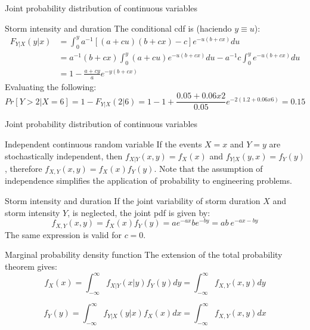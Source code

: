 \documentclass[8pt]{beamer}
\renewcommand{\emph}[1]{\textcolor{myorange}{#1}}
\begin{document}
\begin{frame}{Joint probability distribution of continuous variables}
    \begin{exampleblock}{Storm intensity and duration}
        The conditional cdf is (haciendo $y \equiv u$):
         \begin{align*}
             \displaystyle
             F_{Y|X} (y|x) &= \int_0^y a^{-1}\left[ (a+cu)(b+cx)-c \right]e^{-u(b+cx)} du\\
            &= a^{-1}(b+cx)\int_0^y (a + cu)e^{-u(b+cx)}du -a^{-1} c \int_0^y  e^{-u(b+cx)}du \\
            &= 1-\frac{a+cy}{a}e^{-y(b+cx)}
        \end{align*}
        Evaluating the following:
\[
    Pr[Y> 2 | X=6] = 1- F_{Y|X} (2|6) = 1 - 1 + \frac{0.05 + 0.06 x 2}{0.05} e^{-2(1.2+0.06 x 6)} = 0.15
\]
    \end{exampleblock}
\end{frame}

\begin{frame}{Joint probability distribution of continuous variables}
    \begin{block}{Independent continuous random variable}
        If the events $X=x$ and $Y=y$ are stochastically independent, then $f_{X|Y} (x,y) = f_X (x)$ and $f_{Y|X} (y,x) = f_Y (y)$, therefore $f_{X,Y} (x,y) = f_X (x) f_Y (y)$. 
        Note that the assumption of independence simplifies the application of probability to engineering problems. 
    \end{block}
    
    \begin{exampleblock}{Storm intensity and duration}
        If the joint variability of storm duration  $X$ and storm intensity $Y$, is neglected, the joint \emph{pdf} is given by:
        \[
            f_{X,Y} (x,y) = f_X (x) f_Y (y) = a e^{-ax} b e^{-by} = ab \ e^{-ax-by}
        \]
        The same expression is valid for $c=0$.
    \end{exampleblock}
    \begin{block}{Marginal probability density function}
        The extension of the \emph{total probability theorem} gives:
        \[
            \displaystyle
            f_X (x) = \int_{-\infty}^{\infty} f_{X|Y} (x|y) f_Y (y) dy = \int_{-\infty}^{\infty} f_{X,Y} (x,y) dy
        \]

        \[
            \displaystyle
            f_Y (y) = \int_{-\infty}^{\infty} f_{Y|X} (y|x) f_X (x) dx = \int_{-\infty}^{\infty} f_{X,Y} (x,y) dx
        \]
    \end{block}
\end{frame}
\end{document}
